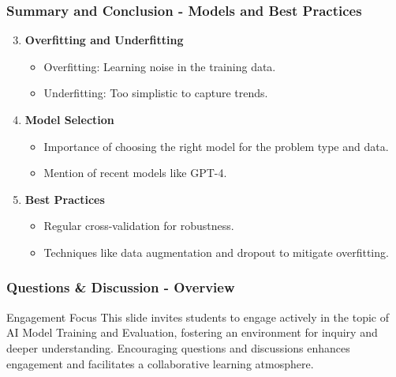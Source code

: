 \documentclass[aspectratio=169]{beamer}
\begin{document}
\begin{frame}[fragile]
    \frametitle{Summary and Conclusion - Models and Best Practices}
    \begin{enumerate}
        \setcounter{enumi}{2} %
        \item \textbf{Overfitting and Underfitting}
        \begin{itemize}
            \item Overfitting: Learning noise in the training data.
            \item Underfitting: Too simplistic to capture trends.
        \end{itemize}

        \item \textbf{Model Selection}
        \begin{itemize}
            \item Importance of choosing the right model for the problem type and data.
            \item Mention of recent models like GPT-4.
        \end{itemize}

        \item \textbf{Best Practices}
        \begin{itemize}
            \item Regular cross-validation for robustness.
            \item Techniques like data augmentation and dropout to mitigate overfitting.
        \end{itemize}
    \end{enumerate}
\end{frame}

\begin{frame}[fragile]
    \frametitle{Questions \& Discussion - Overview}
    \begin{block}{Engagement Focus}
        This slide invites students to engage actively in the topic of AI Model Training and Evaluation, fostering an environment for inquiry and deeper understanding. Encouraging questions and discussions enhances engagement and facilitates a collaborative learning atmosphere.
    \end{block}
\end{frame}
\end{document}
